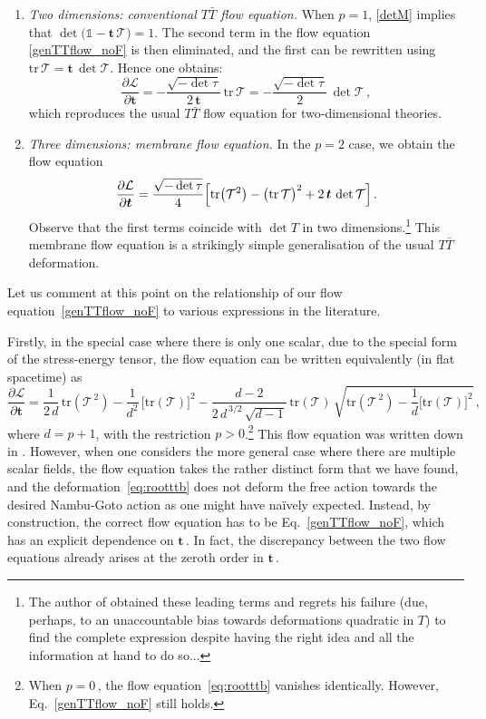 \documentclass[11pt]{article}
\newcommand{\be}{\begin{equation}}
\newcommand{\ee}{\end{equation}}
\newcommand{\CL}{\mathcal{L}}
\newcommand{\CT}{\mathcal{T}}
\newcommand{\p}{\partial}
\newcommand{\tr}{\text{tr}}
\renewcommand{\emph}[1]{\textit{#1}}
\newcommand{\lambdap}{\boldsymbol{t}}
\begin{document}
\begin{enumerate}[(1)]
\item \emph{Two dimensions: conventional $T\bar{T}$ flow equation.} 
When $p=1$, \eqref{detM} implies that $\det \bigl(\mathbb{1} - \lambdap \, \CT \bigr) = 1$.
The second term in the flow equation \eqref{genTTflow_noF} is then eliminated, and the first can be rewritten using $\tr\, \CT = \lambdap \, \det \CT$.
Hence one obtains:
%
\be \label{eq:tdttb}
    \frac{\partial \mathcal{L}}{\partial \lambdap} 
    =
    -\frac{\sqrt{-\det \tau}}{2 \, \lambdap} \, \tr \, \CT 
    =
    - \frac{\sqrt{-\det \tau}}{2} \, \det \CT\,,
\ee
%
which reproduces the usual $T \bar T$ flow equation for two-dimensional theories.


\item \emph{Three dimensions: membrane flow equation.} 
In the $p=2$ case, we obtain the flow equation 
%
\be \label{M2flow}
    \frac{\partial \mathcal{L}}{\partial \lambdap} 
    =
    \frac{\sqrt{- \det \tau}}{4} \Bigl[
    \tr \bigl( \CT^2 \bigr) - \bigl( \tr \, \CT \bigr)^2 
    + 2 \, \lambdap \, \det \CT 
    \Bigr] 
    \,.
\ee
%
Observe that the first terms coincide with $\det T$ in two dimensions.\footnote{The author of \cite{Blair:2020ops} obtained these leading terms and regrets his failure (due, perhaps, to an unaccountable bias towards deformations quadratic in $T$) to find the complete expression despite having the right idea and all the information at hand to do so...}
This membrane flow equation is a strikingly simple generalisation of the usual $T\bar T$ deformation.

\end{enumerate}

Let us comment at this point on the relationship of our flow equation~\eqref{genTTflow_noF} to various expressions in the literature.

Firstly, in the special case where there is only one scalar, due to the special form of the stress-energy tensor, the flow equation can be written equivalently (in flat spacetime) as
%
\be \label{eq:rootttb}
    \frac{\p\CL}{\p \lambdap} = \frac{1}{2 \, d} \, \tr (\CT^{\,2}) - \frac{1}{d^2} \, \bigl[\tr(\CT) \bigr]^2 - \frac{d-2}{2 \, d^{\,3/2} \, \sqrt{d-1}} \, \tr (\CT) \, \sqrt{\tr(\CT^{\,2}) - \frac{1}{d} \bigl[\tr(\CT) \bigr]^2}\,,
\ee
where $d=p+1$, with the restriction $p>0$.\footnote{When $p = 0$\,, the flow equation~\eqref{eq:rootttb} vanishes identically. However, Eq.~\eqref{genTTflow_noF} still holds.}
%
This flow equation was written down in \cite{Ferko:2023sps}. However, when one considers the more general case where there are multiple scalar fields, the flow equation takes the rather distinct form that we have found, and the deformation~\eqref{eq:rootttb} does not deform the free action towards the desired Nambu-Goto action  as one might have na\"{i}vely expected. Instead, by construction, the correct flow equation has to be Eq.~\eqref{genTTflow_noF}, which has an explicit dependence on $\lambdap$\,. In fact, the discrepancy between the two flow equations already arises at the zeroth order in $\lambdap$\,.
\end{document}
